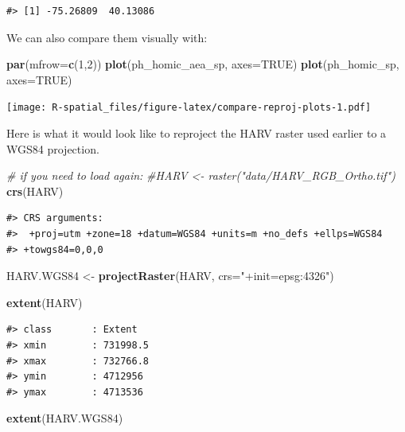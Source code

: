 \documentclass[]{book}
\newenvironment{Shaded}{\begin{snugshade}}{\end{snugshade}}
\newcommand{\KeywordTok}[1]{\textcolor[rgb]{0.13,0.29,0.53}{\textbf{#1}}}
\newcommand{\DataTypeTok}[1]{\textcolor[rgb]{0.13,0.29,0.53}{#1}}
\newcommand{\DecValTok}[1]{\textcolor[rgb]{0.00,0.00,0.81}{#1}}
\newcommand{\StringTok}[1]{\textcolor[rgb]{0.31,0.60,0.02}{#1}}
\newcommand{\CommentTok}[1]{\textcolor[rgb]{0.56,0.35,0.01}{\textit{#1}}}
\newcommand{\OtherTok}[1]{\textcolor[rgb]{0.56,0.35,0.01}{#1}}
\newcommand{\NormalTok}[1]{#1}
\theoremstyle{definition}
\theoremstyle{definition}
\theoremstyle{definition}
\theoremstyle{remark}
\begin{document}
\begin{verbatim}
#> [1] -75.26809  40.13086
\end{verbatim}

We can also compare them visually with:

\begin{Shaded}
\begin{Highlighting}[]
\KeywordTok{par}\NormalTok{(}\DataTypeTok{mfrow=}\KeywordTok{c}\NormalTok{(}\DecValTok{1}\NormalTok{,}\DecValTok{2}\NormalTok{)) }
\KeywordTok{plot}\NormalTok{(ph_homic_aea_sp, }\DataTypeTok{axes=}\OtherTok{TRUE}\NormalTok{)}
\KeywordTok{plot}\NormalTok{(ph_homic_sp, }\DataTypeTok{axes=}\OtherTok{TRUE}\NormalTok{)}
\end{Highlighting}
\end{Shaded}

\texttt{[image: R-spatial\_files/figure-latex/compare-reproj-plots-1.pdf]}

Here is what it would look like to reproject the HARV raster used
earlier to a WGS84 projection.

\begin{Shaded}
\begin{Highlighting}[]
\CommentTok{# if you need to load again:}
\CommentTok{#HARV <- raster("data/HARV_RGB_Ortho.tif")}
\KeywordTok{crs}\NormalTok{(HARV)}
\end{Highlighting}
\end{Shaded}

\begin{verbatim}
#> CRS arguments:
#>  +proj=utm +zone=18 +datum=WGS84 +units=m +no_defs +ellps=WGS84
#> +towgs84=0,0,0
\end{verbatim}

\begin{Shaded}
\begin{Highlighting}[]
\NormalTok{HARV.WGS84 <-}\StringTok{ }\KeywordTok{projectRaster}\NormalTok{(HARV, }\DataTypeTok{crs=}\StringTok{"+init=epsg:4326"}\NormalTok{)}

\KeywordTok{extent}\NormalTok{(HARV)}
\end{Highlighting}
\end{Shaded}

\begin{verbatim}
#> class       : Extent 
#> xmin        : 731998.5 
#> xmax        : 732766.8 
#> ymin        : 4712956 
#> ymax        : 4713536
\end{verbatim}

\begin{Shaded}
\begin{Highlighting}[]
\KeywordTok{extent}\NormalTok{(HARV.WGS84)}
\end{Highlighting}
\end{Shaded}
\end{document}
